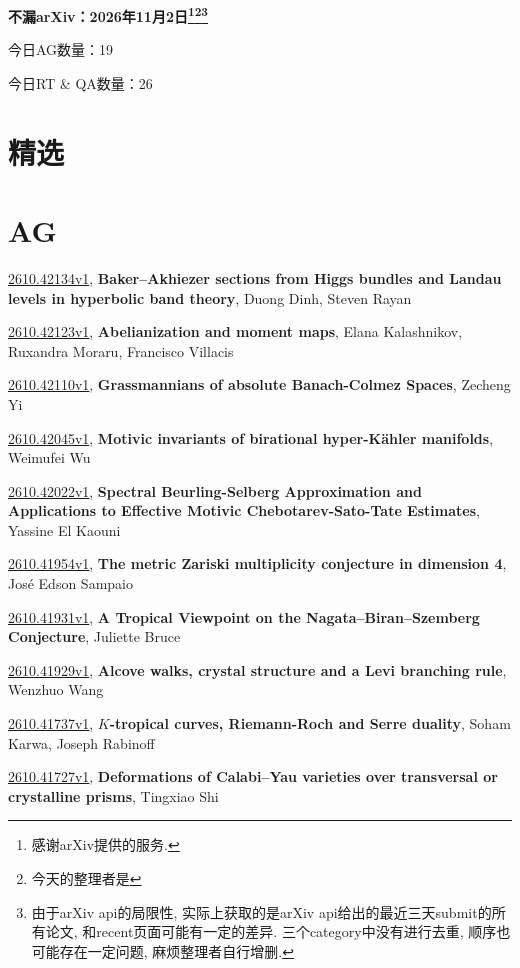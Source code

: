 \documentclass[9pt, a4paper]{article}
\theoremstyle{plain}
\theoremstyle{definition}
\theoremstyle{remark}
\newcommand{\arxiv}[3]{\href{https://arxiv.org/abs/#1}{#1}, \textbf{\textcolor{arxivblue}{#2}}, #3}
\newcommand{\AGnumber}{19}
\newcommand{\RTQAnumber}{26}
\newcommand{\NewestDate}{2026年11月2日}
\newcommand{\todayarXiver}{} %
\begin{document}
\begin{center}
    \Huge\textbf{不漏arXiv：\NewestDate\footnote{感谢arXiv提供的服务.}\footnote{今天的整理者是\todayarXiver}\footnote{由于arXiv api的局限性, 实际上获取的是arXiv api给出的最近三天submit的所有论文, 和recent页面可能有一定的差异. 三个category中没有进行去重, 顺序也可能存在一定问题, 麻烦整理者自行增删.}} \\
\end{center}

\setcounter{section}{-1}

\begin{center}
    今日AG数量：\AGnumber
    
    今日RT \& QA数量：\RTQAnumber
    
\end{center}


\section{精选}


\section{AG}
\arxiv{2610.42134v1}{Baker--Akhiezer sections from Higgs bundles and Landau levels in hyperbolic band theory}{Duong Dinh, Steven Rayan}

\arxiv{2610.42123v1}{Abelianization and moment maps}{Elana Kalashnikov, Ruxandra Moraru, Francisco Villacis}

\arxiv{2610.42110v1}{Grassmannians of absolute Banach-Colmez Spaces}{Zecheng Yi}

\arxiv{2610.42045v1}{Motivic invariants of birational hyper-Kähler manifolds}{Weimufei Wu}

\arxiv{2610.42022v1}{Spectral Beurling-Selberg Approximation and Applications to Effective Motivic Chebotarev-Sato-Tate Estimates}{Yassine El Kaouni}

\arxiv{2610.41954v1}{The metric Zariski multiplicity conjecture in dimension 4}{José Edson Sampaio}

\arxiv{2610.41931v1}{A Tropical Viewpoint on the Nagata--Biran--Szemberg Conjecture}{Juliette Bruce}

\arxiv{2610.41929v1}{Alcove walks, crystal structure and a Levi branching rule}{Wenzhuo Wang}

\arxiv{2610.41737v1}{$K$-tropical curves, Riemann-Roch and Serre duality}{Soham Karwa, Joseph Rabinoff}

\arxiv{2610.41727v1}{Deformations of Calabi--Yau varieties over transversal or crystalline prisms}{Tingxiao Shi}
\end{document}
